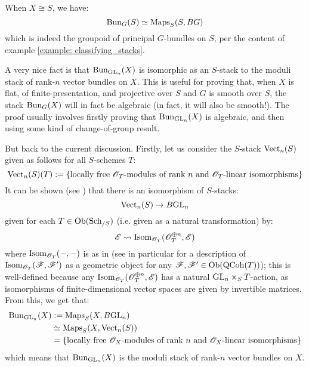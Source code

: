             \begin{example}
                When $X \cong S$, we have:
                    $$\mathrm{Bun}_G(S) \simeq \mathrm{Maps}_S( S, BG )$$
                which is indeed the groupoid of principal $G$-bundles on $S$, per the content of example \ref{example: classifying_stacks}.
            \end{example}
            \begin{example} \label{example: Bun_GL_n_classifies_rank_n_vector_bundles}
                A very nice fact is that $\mathrm{Bun}_{\mathrm{GL}_n}(X)$ is isomorphic as an $S$-stack to the moduli stack of rank-$n$ vector bundles on $X$. This is useful for proving that, when $X$ is flat, of finite-presentation, and projective over $S$ and $G$ is smooth over $S$, the stack $\mathrm{Bun}_G(X)$ will in fact be algebraic (in fact, it will also be smooth!). The proof usually involves firstly proving that $\mathrm{Bun}_{\mathrm{GL}_n}(X)$ is algebraic, and then using some kind of change-of-group result.
    
                But back to the current discussion. Firstly, let us consider the $S$-stack $\mathrm{Vect}_n(S)$ given as follows for all $S$-schemes $T$:
                    $$\mathrm{Vect}_n(S)(T) := \{ \text{locally free $\mathscr{O}_T$-modules of rank $n$ and $\mathscr{O}_T$-linear isomorphisms} \}$$
                It can be shown (see \cite[Lemma 4.1.1]{wang_algebraicity_of_Bun_G}) that there is an isomorphism of $S$-stacks:
                    $$\mathrm{Vect}_n(S) \to B\mathrm{GL}_n$$
                given for each $T \in \mathrm{Ob}(\mathrm{Sch}_{/S})$ (i.e. given as a natural transformation) by:
                    $$\mathscr{E} \leadsto \mathrm{Isom}_{\mathscr{O}_T}( \mathscr{O}_T^{\oplus n}, \mathscr{E} )$$
                where $\mathrm{Isom}_{\mathscr{O}_T}(-, -)$ is as in \cite[\href{https://stacks.math.columbia.edu/tag/08K7}{Tag 08K7}]{stacks} (see \cite[\href{https://stacks.math.columbia.edu/tag/0D3T}{Tag 0D3T}]{stacks} in particular for a description of $\mathrm{Isom}_{\mathscr{O}_T}(\mathscr{F}, \mathscr{F}')$ as a geometric object for any $\mathscr{F}, \mathscr{F}' \in \mathrm{Ob}(\mathrm{QCoh}(T))$); this is well-defined because any $\mathrm{Isom}_{\mathscr{O}_T}( \mathscr{O}_T^{\oplus n}, \mathscr{E} )$ has a natural $\GL_n \x_S T$-action, as isomorphisms of finite-dimensional vector spaces are given by invertible matrices. From this, we get that:
                    $$
                        \begin{aligned}
                            \mathrm{Bun}_{\mathrm{GL}_n}(X) & := \mathrm{Maps}_S(X, B\mathrm{GL}_n)
                            \\
                            & \simeq \mathrm{Maps}_S(X, \mathrm{Vect}_n(S))
                            \\
                            & = \{ \text{locally free $\mathscr{O}_X$-modules of rank $n$ and $\mathscr{O}_X$-linear isomorphisms} \}
                        \end{aligned}
                    $$
                which means that $\mathrm{Bun}_{\mathrm{GL}_n}(X)$ is the moduli stack of rank-$n$ vector bundles on $X$.
            \end{example}
            

